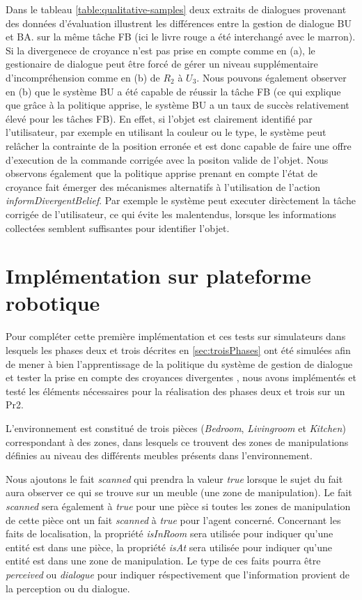 \documentclass[a4paper,11pt,twoside]{StyleThese}
\begin{document}
%
Dans le tableau \ref{table:qualitative-samples} deux extraits de dialogues provenant des données d'évaluation illustrent les différences entre la gestion de dialogue BU et BA. sur la même tâche FB (ici le livre rouge a été interchangé avec le marron). Si la divergenece de croyance n'est pas prise en compte comme en (a), le gestionaire de dialogue peut être forcé de gérer un niveau supplémentaire d'incompréhension comme en (b) de $R_2$ à $U_3$. 
Nous pouvons également observer en (b) que le système BU a été capable de réussir la tâche FB (ce qui explique que grâce à la politique apprise, le système BU a un taux de succès relativement élevé pour les tâches FB). En effet, si l'objet est clairement identifié par l'utilisateur, par exemple en utilisant la couleur ou le type, le système peut relâcher la contrainte de la position erronée et est donc capable de faire une offre d'execution de la commande corrigée avec la positon valide de l'objet.
Nous observons également que la politique apprise prenant en compte l'état de croyance fait émerger des mécanismes alternatifs à l'utilisation de l'action \textit{informDivergentBelief}. Par exemple le système peut executer dirèctement la tâche corrigée de l'utilisateur, ce qui évite les malentendus, lorsque les informations collectées semblent suffisantes pour identifier l'objet.



\section{Implémentation sur plateforme robotique}


Pour compléter cette première implémentation et ces tests sur simulateurs dans lesquels les phases deux et trois décrites en \ref{sec:troisPhases} ont été simulées afin de mener à bien l'apprentissage de la politique du système de gestion de dialogue \cite{simpar_2014} et tester la prise en compte des croyances divergentes \cite{Ferreira2015}, nous avons implémentés et testé les éléments nécessaires pour la réalisation des phases deux et trois sur un Pr2.

L'environnement est constitué de trois pièces (\textit{Bedroom}, \textit{Livingroom} et \textit{Kitchen}) correspondant à des zones, dans lesquels ce trouvent des zones de manipulations définies au niveau des différents meubles présents dans l'environnement.

Nous ajoutons le fait \textit{scanned} qui prendra la valeur \textit{true} lorsque 
le sujet du fait aura observer ce qui se trouve sur un meuble (une zone de manipulation). Le fait \textit{scanned} sera également à \textit{true} pour une pièce si toutes les zones de manipulation de cette pièce ont un fait \textit{scanned} à \textit{true} pour l'agent concerné.
Concernant les faits de localisation, la propriété \textit{isInRoom} sera utilisée pour indiquer qu'une entité est dans une pièce, la propriété \textit{isAt} sera utilisée pour indiquer qu'une entité est dans une zone de manipulation. Le type de ces faits pourra être \textit{perceived} ou \textit{dialogue} pour indiquer réspectivement que l'information provient de la perception ou du dialogue.
\end{document}
